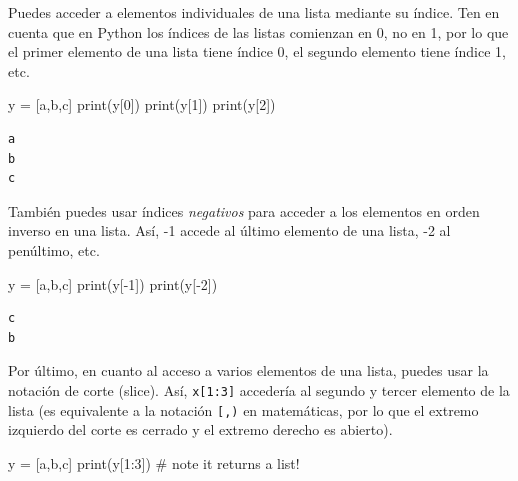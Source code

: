 \documentclass[
  letterpaper,
]{scrbook}
\newenvironment{Shaded}{\begin{snugshade}}{\end{snugshade}}
\newcommand{\BuiltInTok}[1]{\textcolor[rgb]{0.00,0.23,0.31}{#1}}
\newcommand{\CommentTok}[1]{\textcolor[rgb]{0.37,0.37,0.37}{#1}}
\newcommand{\DecValTok}[1]{\textcolor[rgb]{0.68,0.00,0.00}{#1}}
\newcommand{\NormalTok}[1]{\textcolor[rgb]{0.00,0.23,0.31}{#1}}
\newcommand{\OperatorTok}[1]{\textcolor[rgb]{0.37,0.37,0.37}{#1}}
\newcommand{\StringTok}[1]{\textcolor[rgb]{0.13,0.47,0.30}{#1}}
\begin{document}
Puedes acceder a elementos individuales de una lista mediante su índice.
Ten en cuenta que en Python los índices de las listas comienzan en 0, no
en 1, por lo que el primer elemento de una lista tiene índice 0, el
segundo elemento tiene índice 1, etc.

\begin{Shaded}
\begin{Highlighting}[]
\NormalTok{y }\OperatorTok{=}\NormalTok{ [}\StringTok{\textquotesingle{}a\textquotesingle{}}\NormalTok{,}\StringTok{\textquotesingle{}b\textquotesingle{}}\NormalTok{,}\StringTok{\textquotesingle{}c\textquotesingle{}}\NormalTok{]}
\BuiltInTok{print}\NormalTok{(y[}\DecValTok{0}\NormalTok{])}
\BuiltInTok{print}\NormalTok{(y[}\DecValTok{1}\NormalTok{])}
\BuiltInTok{print}\NormalTok{(y[}\DecValTok{2}\NormalTok{])}
\end{Highlighting}
\end{Shaded}

\begin{verbatim}
a
b
c
\end{verbatim}

También puedes usar índices \emph{negativos} para acceder a los
elementos en orden inverso en una lista. Así, -1 accede al último
elemento de una lista, -2 al penúltimo, etc.

\begin{Shaded}
\begin{Highlighting}[]
\NormalTok{y }\OperatorTok{=}\NormalTok{ [}\StringTok{\textquotesingle{}a\textquotesingle{}}\NormalTok{,}\StringTok{\textquotesingle{}b\textquotesingle{}}\NormalTok{,}\StringTok{\textquotesingle{}c\textquotesingle{}}\NormalTok{]}
\BuiltInTok{print}\NormalTok{(y[}\OperatorTok{{-}}\DecValTok{1}\NormalTok{])}
\BuiltInTok{print}\NormalTok{(y[}\OperatorTok{{-}}\DecValTok{2}\NormalTok{])}
\end{Highlighting}
\end{Shaded}

\begin{verbatim}
c
b
\end{verbatim}

Por último, en cuanto al acceso a varios elementos de una lista, puedes
usar la notación de corte (slice). Así, \texttt{x{[}1:3{]}} accedería al
segundo y tercer elemento de la lista (es equivalente a la notación
\texttt{{[},)} en matemáticas, por lo que el extremo izquierdo del corte
es cerrado y el extremo derecho es abierto).

\begin{Shaded}
\begin{Highlighting}[]
\NormalTok{y }\OperatorTok{=}\NormalTok{ [}\StringTok{\textquotesingle{}a\textquotesingle{}}\NormalTok{,}\StringTok{\textquotesingle{}b\textquotesingle{}}\NormalTok{,}\StringTok{\textquotesingle{}c\textquotesingle{}}\NormalTok{]}
\BuiltInTok{print}\NormalTok{(y[}\DecValTok{1}\NormalTok{:}\DecValTok{3}\NormalTok{]) }\CommentTok{\# note it returns a list!}
\end{Highlighting}
\end{Shaded}
\end{document}
